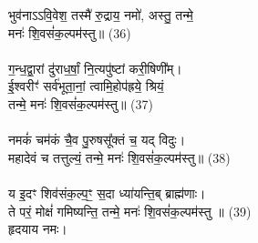 भुव॑नाऽऽवि॒वेश॒ तस्मै॑ रु॒द्राय॒ नमो॑, अस्तु॒ तन्मे॒ \\
मनः॑ शि॒वसं॑क॒ल्पम॑स्तु॥ (36)\\
\\
ग॒न्ध॒द्वा॒रां दु॑राध॒र्षां॒ नि॒त्यपु॑ष्टां करी॒षिणी᳚म्। \\
ई॒श्वरीꣳ॑ सर्व॑भूता॒नां॒ त्वामि॒होप॑ह्रये॒ श्रियं॒  \\
तन्मे॒ मनः॑ शि॒वसं॑क॒ल्पम॑स्तु॥ (37)\\
\\
नमकं॑ चम॑कं चै॒व पु॒रुषसू᳚क्तं च॒ यद् विदुः। \\
महादेवं च तत्तुल्यं॒ तन्मे॒ मनः॑ शि॒वसं॑क॒ल्पम॑स्तु॥ (38)\\
\\
य इ॒दꣳ शिव॑संक॒ल्प॒ꣳ॒ स॒दा ध्या॑यन्ति॒ब् ब्राह्म॑णाः। \\
ते परं॒ मोक्षं॑ गमिष्यन्ति॒ तन्मे॒ मनः॑ शि॒वसं॑क॒ल्पम॑स्तु ॥ (39)\\
हृदयाय नमः।\\
